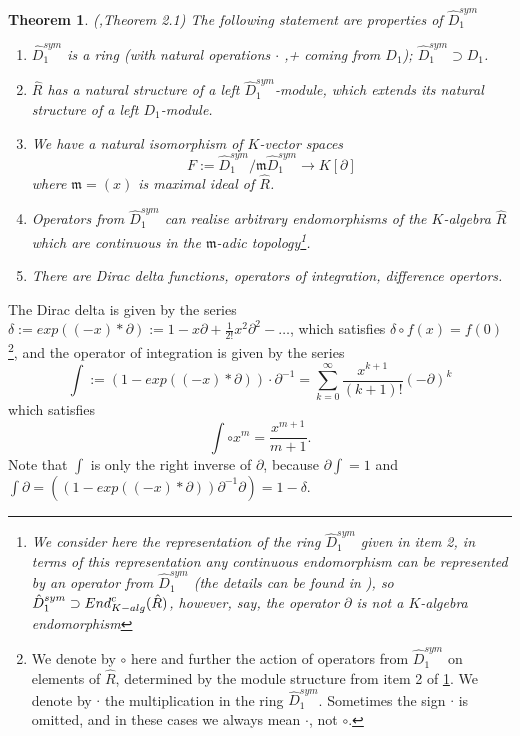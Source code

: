 \documentclass[11pt]{article}
\theoremstyle{definition}
\newcommand{\End}{\mathop {\rm End}}
\theoremstyle{plain}
\newtheorem{theorem}{Theorem}[section]
\numberwithin{equation}{section}
\begin{document}
\begin{theorem}{(\cite{A.Z},Theorem 2.1)}
	\label{T:A.Z 2.1}
	The following statement are properties of $\hat{D}^{sym}_{1}$
	\begin{enumerate}
		\item $\hat{D}^{sym}_{1}$ is a ring (with natural operations $\cdot$ ,+ coming from $D_{1}$); $\hat{D}^{sym}_{1} \supset D_{1}$.
		\item $\hat{R}$ has a natural structure of a left $\hat{D}^{sym}_{1}$-module, which extends its natural structure of a left $D_{1}$-module.
		\item We have a natural isomorphism of $K$-vector spaces 
		$$
		F:=\hat{D}^{sym}_{1}/ \mathfrak{m}\hat{D}^{sym}_{1}\rightarrow K[\partial]
		$$
		where $\mathfrak{m}=(x)$ is maximal ideal of $\hat{R}$.
		\item Operators from $\hat{D}^{sym}_{1}$ can realise arbitrary endomorphisms of the $K$-algebra $\hat{R}$ which are continuous in the $\mathfrak{m}$-adic topology\footnote{ We consider here the representation of the ring  $\hat{D}_1^{sym}$ given in item 2, in terms of this representation any continuous endomorphism can be represented by an operator from $\hat{D}_1^{sym}$ (the details can be found in \cite{A.Z}), so $\hat{D}_1^{sym}\supset \End_{K-alg}^c(\hat{R})$, however, say, the operator $\partial$ is not a $K$-algebra endomorphism}.
		\item There are Dirac delta functions, operators of integration, difference opertors.
	\end{enumerate}
\end{theorem}

The Dirac delta is given by the series $\delta:=exp((-x)\ast \partial):= 1- x\partial +\frac{1}{2!}x^2\partial^2-\ldots$,  which satisfies $\delta \circ f(x)=f(0)$\footnote{ We denote by $\circ$ here and further  the action of operators from $\hat{D}_1^{sym}$ on elements of $\hat{R}$, determined by the module structure from item 2 of \ref{T:A.Z 2.1}. We denote by $\cdot$ the multiplication in the ring $\hat{D}_1^{sym}$. Sometimes the sign $\cdot$ is omitted, and in these cases we  always mean $\cdot$, not $\circ$. 
}, and the operator of integration is given by the series
$$\int:=(1-exp((-x)\ast \partial))\cdot \partial^{-1}=\sum_{k=0}^{\infty}\frac{x^{k+1}}{(k+1)!}(-\partial)^{k} $$
which satisfies  
$$
\int \circ x^{m}=\frac{x^{m+1}}{m+1}.
$$
Note that  $\int$ is only the right inverse of $\partial$, because $\partial \int =1$ and  $\int  \partial =((1-exp((-x)\ast \partial)) \partial^{-1} \partial)=1-\delta$. 
\end{document}
